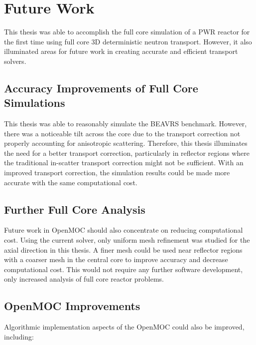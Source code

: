 \section{Future Work}
\label{sec:future-work}

This thesis was able to accomplish the full core simulation of a \ac{PWR} reactor for the first time using full core 3D deterministic neutron transport. However, it also illuminated areas for future work in creating accurate and efficient transport solvers.

\subsection{Accuracy Improvements of Full Core Simulations}

This thesis was able to reasonably simulate the BEAVRS benchmark. However, there was a noticeable tilt across the core due to the transport correction not properly accounting for anisotropic scattering. Therefore, this thesis illuminates the need for a better transport correction, particularly in reflector regions where the traditional in-scatter transport correction might not be sufficient. With an improved transport correction, the simulation results could be made more accurate with the same computational cost.

\subsection{Further Full Core Analysis}

Future work in OpenMOC should also concentrate on reducing computational cost. Using the current solver, only uniform mesh refinement was studied for the axial direction in this thesis. A finer mesh could be used near reflector regions with a coarser mesh in the central core to improve accuracy and decrease computational cost. This would not require any further software development, only increased analysis of full core reactor problems.

\subsection{OpenMOC Improvements}

Algorithmic implementation aspects of the OpenMOC could also be improved, including:


